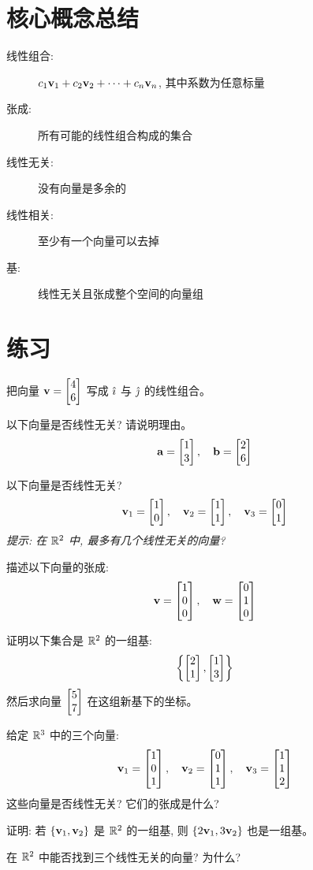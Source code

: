 \section{核心概念总结}

\begin{summary}
\begin{description}
    \item[线性组合:] $c_1\mathbf{v}_1 + c_2\mathbf{v}_2 + \cdots + c_n\mathbf{v}_n$, 其中系数为任意标量
    \item[张成:] 所有可能的线性组合构成的集合
    \item[线性无关:] 没有向量是多余的
    \item[线性相关:] 至少有一个向量可以去掉
    \item[基:] 线性无关且张成整个空间的向量组
\end{description}
\end{summary}

\section{练习}

\begin{exercise}
把向量 $\mathbf{v} = \begin{bmatrix} 4 \\ 6 \end{bmatrix}$ 写成 $\hat{\imath}$ 与 $\hat{\jmath}$ 的线性组合。
\end{exercise}

\begin{exercise}
以下向量是否线性无关? 请说明理由。
\[
\mathbf{a} = \begin{bmatrix} 1 \\ 3 \end{bmatrix}, \quad \mathbf{b} = \begin{bmatrix} 2 \\ 6 \end{bmatrix}
\]
\end{exercise}

\begin{exercise}
以下向量是否线性无关?
\[
\mathbf{v}_1 = \begin{bmatrix} 1 \\ 0 \end{bmatrix}, \quad \mathbf{v}_2 = \begin{bmatrix} 1 \\ 1 \end{bmatrix}, \quad \mathbf{v}_3 = \begin{bmatrix} 0 \\ 1 \end{bmatrix}
\]
\textit{提示: 在 $\mathbb{R}^2$ 中, 最多有几个线性无关的向量?}
\end{exercise}

\begin{exercise}
描述以下向量的张成:
\[
\mathbf{v} = \begin{bmatrix} 1 \\ 0 \\ 0 \end{bmatrix}, \quad \mathbf{w} = \begin{bmatrix} 0 \\ 1 \\ 0 \end{bmatrix}
\]
\end{exercise}

\begin{exercise}[挑战]
证明以下集合是 $\mathbb{R}^2$ 的一组基:
\[
\left\{ \begin{bmatrix} 2 \\ 1 \end{bmatrix}, \begin{bmatrix} 1 \\ 3 \end{bmatrix} \right\}
\]
然后求向量 $\begin{bmatrix} 5 \\ 7 \end{bmatrix}$ 在这组新基下的坐标。
\end{exercise}

\begin{exercise}
给定 $\mathbb{R}^3$ 中的三个向量:
\[
\mathbf{v}_1 = \begin{bmatrix} 1 \\ 0 \\ 1 \end{bmatrix}, \quad \mathbf{v}_2 = \begin{bmatrix} 0 \\ 1 \\ 1 \end{bmatrix}, \quad \mathbf{v}_3 = \begin{bmatrix} 1 \\ 1 \\ 2 \end{bmatrix}
\]
这些向量是否线性无关? 它们的张成是什么?
\end{exercise}

\begin{problem}
证明: 若 $\{\mathbf{v}_1, \mathbf{v}_2\}$ 是 $\mathbb{R}^2$ 的一组基, 则 $\{2\mathbf{v}_1, 3\mathbf{v}_2\}$ 也是一组基。
\end{problem}

\begin{problem}
在 $\mathbb{R}^2$ 中能否找到三个线性无关的向量? 为什么?
\end{problem}
